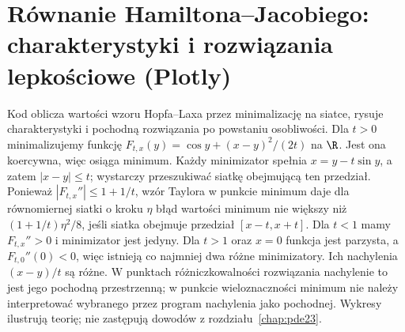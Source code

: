 \section{Równanie Hamiltona--Jacobiego: charakterystyki i rozwiązania lepkościowe (Plotly)}
Kod oblicza wartości wzoru Hopfa--Laxa przez minimalizację na siatce,
rysuje charakterystyki i pochodną rozwiązania po powstaniu osobliwości.
Dla $t>0$ minimalizujemy funkcję
$F_{t,x}(y)=\cos y+(x-y)^2/(2t)$ na $\R$.
Jest ona koercywna, więc osiąga minimum.
Każdy minimizator spełnia $x=y-t\sin y$,
a zatem $|x-y|\le t$; wystarczy przeszukiwać
siatkę obejmującą ten przedział.
Ponieważ $|F_{t,x}''|\le1+1/t$, wzór Taylora
w punkcie minimum daje dla równomiernej siatki
o kroku $\eta$ błąd wartości minimum nie większy
niż $(1+1/t)\eta^2/8$, jeśli siatka obejmuje
przedział $[x-t,x+t]$.
Dla $t<1$ mamy $F_{t,x}''>0$ i minimizator jest
jedyny. Dla $t>1$ oraz $x=0$ funkcja jest parzysta,
a $F_{t,0}''(0)<0$, więc istnieją co najmniej dwa
różne minimizatory. Ich nachylenia $(x-y)/t$ są różne.
W punktach różniczkowalności rozwiązania nachylenie
to jest jego pochodną przestrzenną; w punkcie
wieloznaczności minimum nie należy interpretować
wybranego przez program nachylenia jako pochodnej.
Wykresy ilustrują teorię; nie zastępują dowodów
z rozdziału~\ref{chap:pde23}.
